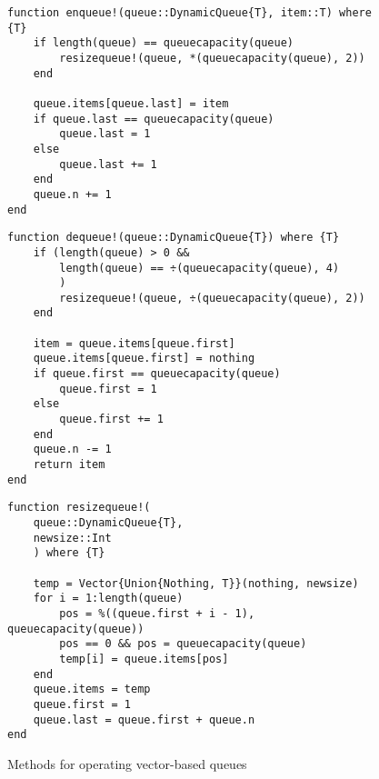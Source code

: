 \documentclass[a4paper, 11pt]{article}
\begin{document}
    \begin{figure}[H]
        \centering
    \begin{verbatim}
function enqueue!(queue::DynamicQueue{T}, item::T) where {T}
    if length(queue) == queuecapacity(queue) 
        resizequeue!(queue, *(queuecapacity(queue), 2))
    end

    queue.items[queue.last] = item
    if queue.last == queuecapacity(queue)
        queue.last = 1
    else
        queue.last += 1
    end
    queue.n += 1
end
    \end{verbatim}
    \begin{verbatim}
function dequeue!(queue::DynamicQueue{T}) where {T}
    if (length(queue) > 0 && 
        length(queue) == ÷(queuecapacity(queue), 4)
        )
        resizequeue!(queue, ÷(queuecapacity(queue), 2))
    end

    item = queue.items[queue.first] 
    queue.items[queue.first] = nothing
    if queue.first == queuecapacity(queue)
        queue.first = 1
    else
        queue.first += 1
    end
    queue.n -= 1
    return item
end
    \end{verbatim}
    \begin{verbatim}
function resizequeue!(
    queue::DynamicQueue{T}, 
    newsize::Int
    ) where {T}
    
    temp = Vector{Union{Nothing, T}}(nothing, newsize)
    for i = 1:length(queue)
        pos = %((queue.first + i - 1), queuecapacity(queue))
        pos == 0 && pos = queuecapacity(queue)
        temp[i] = queue.items[pos]
    end
    queue.items = temp
    queue.first = 1
    queue.last = queue.first + queue.n
end
    \end{verbatim}
    \caption{Methods for operating vector-based queues}
    \label{code:vectoroperations}
    \end{figure}
\end{document}
